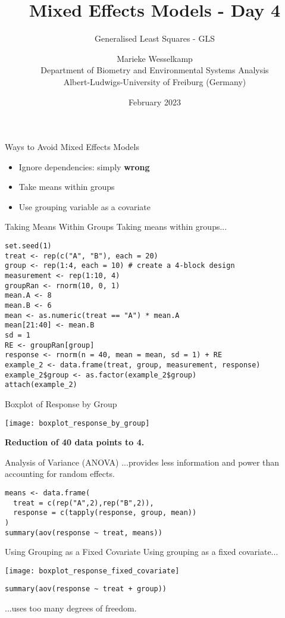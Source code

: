 \documentclass{beamer}
\title{Mixed Effects Models - Day 4}
\subtitle{Generalised Least Squares - GLS}
\author{Marieke Wesselkamp\\Department of Biometry and Environmental Systems Analysis\\Albert-Ludwigs-University of Freiburg (Germany)}
\date{February 2023}
\begin{document}
\begin{frame}
  \titlepage
\end{frame}

\begin{frame}{Ways to Avoid Mixed Effects Models}
  \begin{itemize}
    \item Ignore dependencies: simply \textbf{wrong}
    \item Take means within groups
    \item Use grouping variable as a covariate
  \end{itemize}
\end{frame}

\begin{frame}[fragile]{Taking Means Within Groups}
  \small{Taking means within groups...}
  
  \begin{verbatim}
set.seed(1)
treat <- rep(c("A", "B"), each = 20)
group <- rep(1:4, each = 10) # create a 4-block design
measurement <- rep(1:10, 4)
groupRan <- rnorm(10, 0, 1)
mean.A <- 8
mean.B <- 6
mean <- as.numeric(treat == "A") * mean.A
mean[21:40] <- mean.B
sd = 1
RE <- groupRan[group]
response <- rnorm(n = 40, mean = mean, sd = 1) + RE
example_2 <- data.frame(treat, group, measurement, response)
example_2$group <- as.factor(example_2$group)
attach(example_2)
  \end{verbatim}
\end{frame}

\begin{frame}{Boxplot of Response by Group}
  \begin{center}
    \texttt{[image: boxplot\_response\_by\_group]} %
  \end{center}
  \smallskip
  \textbf{Reduction of 40 data points to 4.}
\end{frame}

\begin{frame}[fragile]{Analysis of Variance (ANOVA)}
  \small{...provides less information and power than accounting for random effects.}
  \begin{verbatim}
means <- data.frame(
  treat = c(rep("A",2),rep("B",2)), 
  response = c(tapply(response, group, mean))
)
summary(aov(response ~ treat, means))
  \end{verbatim}
\end{frame}

\begin{frame}[fragile]{Using Grouping as a Fixed Covariate}
  \small{Using grouping as a fixed covariate...}
  
  \begin{center}
    \texttt{[image: boxplot\_response\_fixed\_covariate]} %
  \end{center}
  
  \begin{verbatim}
summary(aov(response ~ treat + group))
  \end{verbatim}
  \small{...uses too many degrees of freedom.}
\end{frame}
\end{document}
